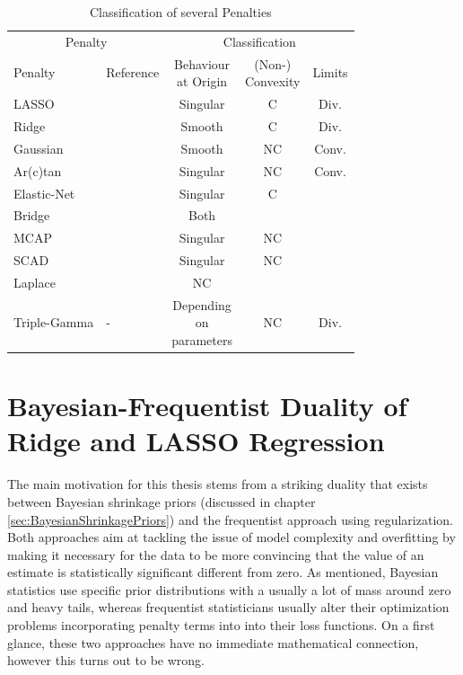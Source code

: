 \documentclass[12pt,a4paper]{article}
\begin{document}
\begin{table}[!h]
\begin{center}
\begin{tabular}{llccc}\toprule
 \multicolumn{2}{c}{Penalty} & \multicolumn{3}{c}{Classification}\\
		\cmidrule(r{4pt}){1-2} \cmidrule(l){3-5}
Penalty     	& Reference  & \makecell{Behaviour\\ at Origin} & \makecell{(Non-)\\Convexity} & Limits\\\midrule

LASSO 	& \textcite{Tibishirani1996}	& Singular	&	C 	& Div.\\
Ridge 	& \textcite{HoerlKennard1970a}	& Smooth		& C			& Div.\\
Gaussian & \textcite{JohnVettamWu2022}	& Smooth		& NC 	& Conv.\\
Ar(c)tan 	& \textcite{WangZhu2016}	& Singular 	& NC 	& Conv. \\
Elastic-Net & \textcite{ZouHastie2005} & Singular & C &\\
Bridge & \textcite{FrankFriedman1993}& Both &&\\
MCAP & \textcite{Zhang2010}& Singular & NC &\\
SCAD & \textcite{FanLi2001} & Singular & NC &\\
Laplace & \textcite{TrzaskoManduca2009} & NC &&\\
Triple-Gamma & - & \makecell{Depending\\ on \\ parameters} & NC & Div. \\

\end{tabular}
\caption{Classification of several Penalties}
\label{tab:ClassificationOfPenalties}
\end{center}
\end{table}
 
\section{Bayesian-Frequentist Duality of Ridge and LASSO Regression}

The main motivation for this thesis stems from a striking duality that exists between Bayesian shrinkage priors (discussed in chapter \ref{sec:BayesianShrinkagePriors}) and the frequentist approach using regularization. Both approaches aim at tackling the issue of model complexity and overfitting by making it necessary for the data to be more convincing that the value of an estimate is statistically significant different from zero. As mentioned, Bayesian statistics use specific prior distributions with a usually a lot of mass around zero and heavy tails, whereas frequentist statisticians usually alter their optimization problems incorporating penalty terms into into their loss functions. On a first glance, these two approaches have no immediate mathematical connection, however this turns out to be wrong.\\
\end{document}
